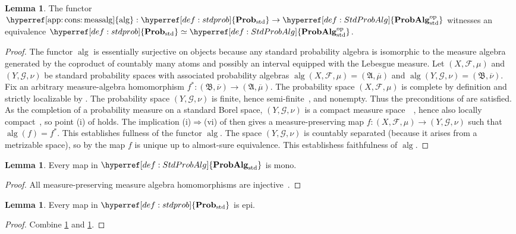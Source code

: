 \documentclass[
  sigconf,
  screen, ]{acmart}
\theoremstyle{definition}
\newtheorem{lemma}[theorem]{Lemma}
\newcommand\calF{\mathcal F}
\newcommand\calG{\mathcal G}
\newcommand\frakA{\mathfrak A}
\newcommand\frakB{\mathfrak B}
\newcommand\fremlinft[3]{\citet[\href{https://www1.essex.ac.uk/maths/people/fremlin/chap#2.pdf\#page=#3}{#1}]{fremlin2000measure}}
\newcommand\fremlinf[3]{\cite[\href{https://www1.essex.ac.uk/maths/people/fremlin/chap#2.pdf\#page=#3}{#1}]{fremlin2000measure}}
\newcommand\nref[2]{\hyperref[#1]{#2}} \newcommand\checkhigh{{\huge{\color{red}\textbf{TODO: check}}}}
\newcommand\op{^{\rm op}}
\newcommand\measalg{\operatorname{\nref{app:cons:measalg}{alg}}}
\newcommand\texStdProb{\mathbf{Prob}_{\rm std}}
\newcommand\StdProb{{\nref{def:stdprob}{\texStdProb}}}
\newcommand\StdProbAlg{\nref{def:StdProbAlg}{\mathbf{ProbAlg}_{\rm std}}}
\newcommand\StdProbAlgop{\nref{def:StdProbAlg}{\mathbf{ProbAlg}_{\rm std}\op}}
\begin{document}
\begin{lemma} \label{app:lem:stdprob-dual}
  The functor $\measalg:\StdProb\to\StdProbAlgop$
  witnesses an equivalence
  $\StdProb\simeq\StdProbAlgop$.
\end{lemma}
\begin{proof}
  The functor $\measalg$ is essentially surjective
  on objects because any standard probability algebra
  is isomorphic to the measure algebra
  generated by the coproduct of countably many atoms and possibly an interval
  equipped with the Lebesgue measure.
  Let $(X,\calF,\mu)$ and $(Y,\calG,\nu)$
  be standard probability spaces
  with associated probability algebras
  $\measalg(X,\calF,\mu) = (\frakA,\overline\mu)$
  and $\measalg(Y,\calG,\nu) = (\frakB,\overline\nu)$.
  Fix an arbitrary measure-algebra homomorphism
  $f^* : (\frakB,\overline\nu)\to(\frakA,\overline\mu)$.
  The probability space $(X,\calF,\mu)$ is complete by definition
  and strictly localizable by \fremlinft{221L}{21}{4}.
  The probability space $(Y,\calG,\nu)$ is finite, hence semi-finite~\fremlinf{221F}{21}{4},
  and nonempty.
  Thus the preconditions of 
  \fremlinft{343B}{34}{22} are satisfied.
  As the completion of a probability measure on a
  standard Borel space, $(Y,\calG,\nu)$
  is a compact measure space~\fremlinf{433X(e)(i)}{43}{15}~\fremlinf{342G(b)}{34}{15},
  hence also locally compact~\fremlinf{342H(a)}{34}{17},
  so point (i) of \fremlinft{343B}{34}{22} holds.
  The implication (i)$\Rightarrow$(vi) of \fremlinft{343B}{34}{22}
  then gives a measure-preserving map $f : (X,\calF,\mu)\to (Y,\calG,\nu)$
  such that $\measalg(f) = f^*$.
  This establishes fullness of the functor $\measalg$.
  The space $(Y,\calG,\nu)$ is
  countably separated (because it arises from a metrizable space),
  so by \fremlinft{343G}{34}{26} the map
  $f$ is unique up to almost-sure equivalence.
  This establishess faithfulness of $\measalg$.
\end{proof}

\begin{lemma} \label{app:lem:stdprobalg-mono}
  Every map in $\StdProbAlg$ is mono.
\end{lemma}
\begin{proof}
  All measure-preserving measure algebra homomorphisms
  are injective~\fremlinf{324K(a)}{32}{25}.
\end{proof}

\begin{lemma} \label{app:lem:std-prob-epi}
  Every map in $\StdProb$ is epi.
\end{lemma}
\begin{proof}
  Combine \cref{app:lem:stdprob-dual} and \cref{app:lem:stdprobalg-mono}.
\end{proof}
\end{document}
